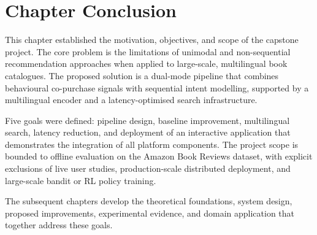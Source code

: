 \section{Chapter Conclusion}

This chapter established the motivation, objectives, and scope of the capstone project.
The core problem is the limitations of unimodal and non-sequential recommendation approaches when applied to large-scale, multilingual book catalogues.
The proposed solution is a dual-mode pipeline that combines behavioural co-purchase signals with sequential intent modelling, supported by a multilingual encoder and a latency-optimised search infrastructure.

Five goals were defined: pipeline design, baseline improvement, multilingual search, latency reduction, and deployment of an interactive application that demonstrates the integration of all platform components.
The project scope is bounded to offline evaluation on the Amazon Book Reviews dataset, with explicit exclusions of live user studies, production-scale distributed deployment, and large-scale bandit or RL policy training.

The subsequent chapters develop the theoretical foundations, system design, proposed improvements, experimental evidence, and domain application that together address these goals.

